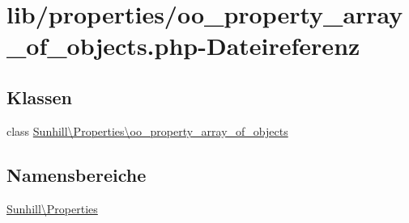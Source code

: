 \hypertarget{oo__property__array__of__objects_8php}{}\section{lib/properties/oo\+\_\+property\+\_\+array\+\_\+of\+\_\+objects.php-\/\+Dateireferenz}
\label{oo__property__array__of__objects_8php}
\subsection*{Klassen}
\begin{DoxyCompactItemize}
\item 
class \hyperlink{classSunhill_1_1Properties_1_1oo__property__array__of__objects}{Sunhill\textbackslash{}\+Properties\textbackslash{}oo\+\_\+property\+\_\+array\+\_\+of\+\_\+objects}
\end{DoxyCompactItemize}
\subsection*{Namensbereiche}
\begin{DoxyCompactItemize}
\item 
 \hyperlink{namespaceSunhill_1_1Properties}{Sunhill\textbackslash{}\+Properties}
\end{DoxyCompactItemize}
